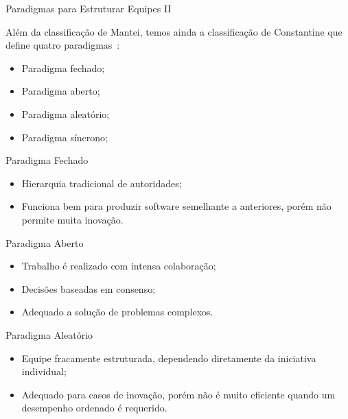 \documentclass[xcolor=x11names,compress]{beamer}
\begin{document}
\begin{frame}{Paradigmas para Estruturar Equipes II}

Além da classificação de Mantei, temos ainda a classificação de Constantine que define quatro paradigmas~\cite{Pressman-2001}:

\begin{itemize}
\itemsep 5mm

\item Paradigma fechado;

\item Paradigma aberto;

\item Paradigma aleatório;

\item Paradigma síncrono;

\end{itemize}

\end{frame}

\begin{frame}{Paradigma Fechado}

\begin{itemize}
\itemsep 5mm

\item Hierarquia tradicional de autoridades;

\item Funciona bem para produzir software semelhante a anteriores, porém  não permite muita inovação.

\end{itemize}

\end{frame}

\begin{frame}{Paradigma Aberto}

\begin{itemize}
\itemsep 5mm

\item Trabalho é realizado com intensa colaboração;

\item Decisões baseadas em consenso;

\item Adequado a solução de problemas complexos.

\end{itemize}

\end{frame}

\begin{frame}{Paradigma Aleatório}

\begin{itemize}
\itemsep 5mm

\item Equipe fracamente estruturada, dependendo diretamente da iniciativa individual;

\item Adequado para casos de inovação, porém não é muito eficiente quando um desempenho ordenado é requerido.

\end{itemize}

\end{frame}
\end{document}
